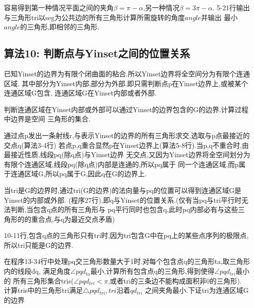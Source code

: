 \documentclass[a4paper]{book}
\numberwithin{equation}{chapter}
\theoremstyle{definition}
\begin{document}
容易得到第一种情况平面之间的夹角$\beta = \pi - \alpha$,另一种情况$\beta = 3 \pi - \alpha$.
5-21行输出与三角形tri以seg为公共边的所有三角形计算所需旋转的角度$angle$并输出
最小$angle$的三角形,即相邻的三角形.

\subsection{算法10: 判断点与Yinset之间的位置关系}

已知Yinset的边界为有限个闭曲面的粘合.所以Yinset边界将全空间分为有限个连通区域.
其中部分为Yinset内部,部分为外部.即只需判断点p在Yinset边界上,或被某个连通区域G包含,
连通区域G在Yinset内部或者外部.

判断连通区域在Yinset内部或外部可以通过Yinset的边界包含的G的边界.计算过程中边界是空间
三角形的集合.

通过点p发出一条射线r,与表示Yinset的边界的所有三角形求交,选取与p点最接近的交点q(算法3-4行)
若点p,q重合显然p在Yinset边界上(算法5-8行).当p,q不重合时,由最接近性质,线段pq(除q点)与Yinset边界
无交点,又因为Yinset边界将全空间划分为有限个连通区域,线段pq(除q点)内部是连通的,所以pq属于
同一个连通区域,而p属于连通区域G,所以pq属于G,因此q在G的边界上.

当tri是G的边界时,通过tri(G的边界)的法向量与pq的位置可以得到连通区域G是Yinset的内部或外部.
(程序27行),即q与Yinset的位置关系.(仅有当pq与tri平行时无法判断,当包含q点的所有三角形与
pq平行同时也包含q,此时pq内部必有与这些三角形的的重合点,与q为最近交点矛盾)

10-11行,包含q点的三角形只有tri时,因为tri包含G中在pq上的某些点序列的极限点,
所以tri只能是G的边界.

在程序13-34行中处理pq交三角形数量大于1时.对每个包含点q的三角形ta,取三角形内的线段dq,
满足角度$\angle pqd_{ta}$最小,计算所有包含点q的三角形,得到使得$\angle pqd_{tri}$最小的
所有三角形集合tris($\angle pqd_{tri} < \pi$,或者tri的三条边不能构成面积非0的三角形).
计算tris中的三角形tri满足$\triangle pqd_{tri},tri$沿着$qd_{tri}$
之间夹角最小.下证tri为连通区域G的边界
\end{document}
